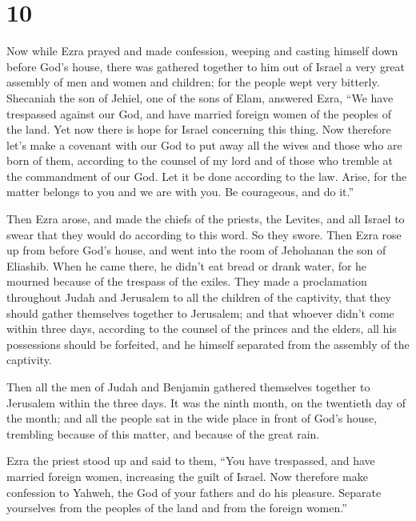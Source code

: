 \hypertarget{section-9}{%
\section{10}\label{section-9}}

 Now while Ezra prayed and made confession, weeping and
casting himself down before God's house, there was gathered together to
him out of Israel a very great assembly of men and women and children;
for the people wept very bitterly.  Shecaniah the son of
Jehiel, one of the sons of Elam, answered Ezra, ``We have trespassed
against our God, and have married foreign women of the peoples of the
land. Yet now there is hope for Israel concerning this thing.
 Now therefore let's make a covenant with our God to put
away all the wives and those who are born of them, according to the
counsel of my lord and of those who tremble at the commandment of our
God. Let it be done according to the law.  Arise, for the
matter belongs to you and we are with you. Be courageous, and do it.''

 Then Ezra arose, and made the chiefs of the priests, the
Levites, and all Israel to swear that they would do according to this
word. So they swore.  Then Ezra rose up from before God's
house, and went into the room of Jehohanan the son of Eliashib. When he
came there, he didn't eat bread or drank water, for he mourned because
of the trespass of the exiles.  They made a proclamation
throughout Judah and Jerusalem to all the children of the captivity,
that they should gather themselves together to Jerusalem; 
and that whoever didn't come within three days, according to the counsel
of the princes and the elders, all his possessions should be forfeited,
and he himself separated from the assembly of the captivity.

 Then all the men of Judah and Benjamin gathered themselves
together to Jerusalem within the three days. It was the ninth month, on
the twentieth day of the month; and all the people sat in the wide place
in front of God's house, trembling because of this matter, and because
of the great rain.

 Ezra the priest stood up and said to them, ``You have
trespassed, and have married foreign women, increasing the guilt of
Israel.  Now therefore make confession to Yahweh, the God
of your fathers and do his pleasure. Separate yourselves from the
peoples of the land and from the foreign women.''

